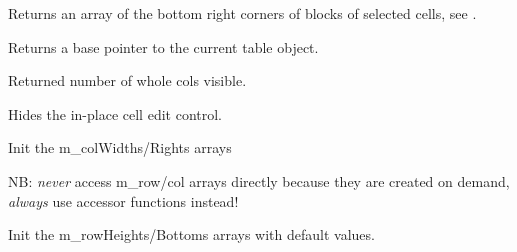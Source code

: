 \label{wxgridgetselectionblockbottomright}


Returns an array of the bottom right corners of blocks of selected cells,
see .



\label{wxgridgetselectionforeground}




\label{wxgridgettable}


Returns a base pointer to the current table object.



\label{wxgridgetviewwidth}


Returned number of whole cols visible.



\label{wxgridhidecelleditcontrol}


Hides the in-place cell edit control.



\label{wxgridinitcolwidths}


Init the m\_colWidths/Rights arrays



\label{wxgridinitrowheights}


NB: {\it never} access m\_row/col arrays directly because they are created
on demand, {\it always} use accessor functions instead!

Init the m\_rowHeights/Bottoms arrays with default values.



\label{wxgridinsertcols}


